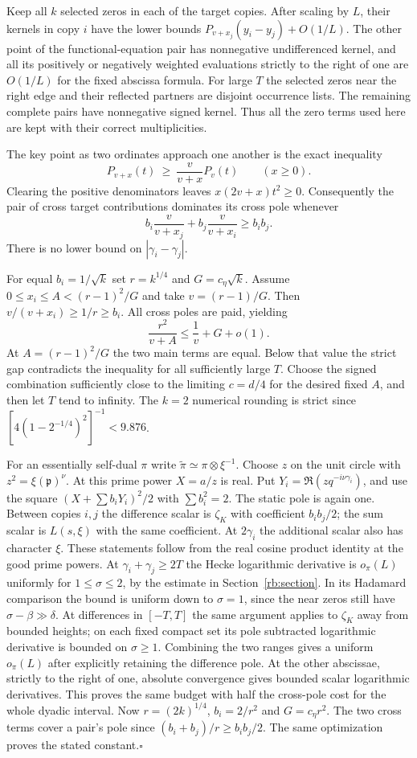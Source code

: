 \documentclass[11pt]{article}
\begin{document}
Keep all $k$ selected zeros in each of the target copies. After scaling by
$L$, their kernels in copy $i$ have the lower bounds
$P_{v+x_j}(y_i-y_j)+O(1/L)$. The other point of the functional-equation
pair has nonnegative undifferenced kernel, and all its positively or
negatively weighted evaluations strictly to the right of one are $O(1/L)$
for the fixed abscissa formula. For large $T$ the selected zeros near the
right edge and their reflected partners are disjoint occurrence lists.
The remaining complete pairs have nonnegative signed kernel. Thus all the
zero terms used here are kept with their correct multiplicities.

The key point as two ordinates approach one another is the exact inequality
\[
   P_{v+x}(t)\ \ge\ \frac{v}{v+x}P_v(t)\qquad(x\ge0).
\]
Clearing the positive denominators leaves $x(2v+x)t^2\ge0$.
Consequently the pair of cross target contributions dominates its cross
pole whenever
\[
  b_i\frac{v}{v+x_j}+b_j\frac{v}{v+x_i}\ge b_i b_j.
\]
There is no lower bound on $|\gamma_i-\gamma_j|$.

For equal $b_i=1/\sqrt k$ set $r=k^{1/4}$ and $G=c_\eta\sqrt k$.
Assume $0\le x_i\le A<(r-1)^2/G$ and take $v=(r-1)/G$.
Then $v/(v+x_i)\ge1/r\ge b_i$. All cross poles are paid, yielding
\[
        \frac{r^2}{v+A}\le \frac1v+G+o(1).
\]
At $A=(r-1)^2/G$ the two main terms are equal. Below that value the
strict gap contradicts the inequality for all sufficiently large $T$.
Choose the signed combination sufficiently close to the limiting
$c=d/4$ for the desired fixed $A$, and then let $T$ tend to infinity.
The $k=2$ numerical rounding is strict since
$[4(1-2^{-1/4})^2]^{-1}<9.876$.

For an essentially self-dual $\pi$ write
$\widetilde\pi\simeq\pi\otimes\xi^{-1}$. Choose $z$ on the unit circle
with $z^2=\xi(\mathfrak p)^\nu$. At this prime power $X=a/z$ is real.
Put $Y_i=\Re(zq^{-i\nu\gamma_i})$, and use the square
$(X+\sum b_iY_i)^2/2$ with $\sum b_i^2=2$.
The static pole is again one. Between copies $i,j$ the difference scalar
is $\zeta_K$ with coefficient $b_i b_j/2$; the sum scalar is $L(s,\xi)$
with the same coefficient. At $2\gamma_i$ the additional scalar also has
character $\xi$. These statements follow from the real cosine product
identity at the good prime powers. At $\gamma_i+\gamma_j\ge2T$ the Hecke
logarithmic derivative is $o_\pi(L)$ uniformly for $1\le\sigma\le2$,
by the estimate in Section~\ref{rb:section}. In its Hadamard comparison the bound is uniform down to $\sigma=1$, since the near zeros still have $\sigma-\beta\gg\delta$. At differences in $[-T,T]$ the same argument
applies to $\zeta_K$ away from bounded heights; on each fixed compact
set its pole subtracted logarithmic derivative is bounded on $\sigma\ge1$.
Combining the two ranges gives a uniform $o_\pi(L)$ after explicitly
retaining the difference pole. At the other abscissae, strictly to the
right of one, absolute convergence gives bounded scalar logarithmic
derivatives. This proves the same budget with half the cross-pole cost
for the whole dyadic interval. Now $r=(2k)^{1/4}$, $b_i=2/r^2$ and
$G=c_\eta r^2$. The two cross terms cover a pair's pole since
$(b_i+b_j)/r\ge b_i b_j/2$. The same optimization proves the stated
constant.\hfill$\square$
\end{document}
